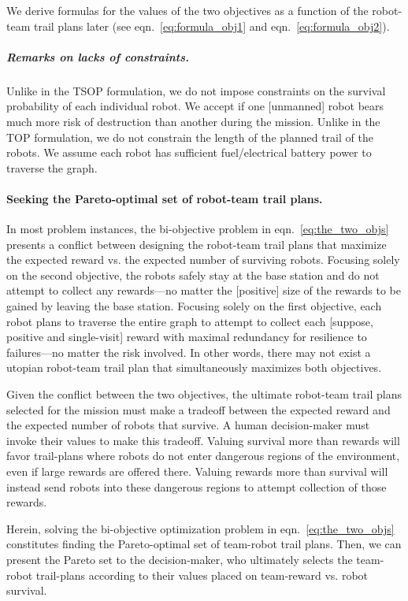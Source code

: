 \documentclass[11pt, oneside]{article}
\begin{document}
We derive formulas for the values of the two objectives as a function of the robot-team trail plans later (see eqn.~\ref{eq:formula_obj1} and eqn.~\ref{eq:formula_obj2}). 

\subparagraph{Remarks on lacks of constraints.} 
Unlike in the TSOP formulation, we do not impose constraints on the survival probability of each individual robot. We accept if one [unmanned] robot bears much more risk of destruction than another during the mission. 
Unlike in the TOP formulation, we do not constrain the length of the planned trail of the robots. We assume each robot has sufficient fuel/electrical battery power to traverse the graph.


\paragraph{Seeking the Pareto-optimal set of robot-team trail plans.} 
In most problem instances, the bi-objective problem in eqn.~\ref{eq:the_two_objs} presents a conflict between designing the robot-team trail plans that maximize the expected reward vs. the expected number of surviving robots. 
Focusing solely on the second objective, the robots safely stay at the base station and do not attempt to collect any rewards---no matter the [positive] size of the rewards to be gained by leaving the base station. 
Focusing solely on the first objective, each robot plans to traverse the entire graph to attempt to collect each [suppose, positive and single-visit] reward with maximal redundancy for resilience to failures---no matter the risk involved.
In other words, there may not exist a utopian robot-team trail plan that simultaneously maximizes both objectives. 

Given the conflict between the two objectives, the ultimate robot-team trail plans selected for the mission must make a tradeoff between the expected reward and the expected number of robots that survive. 
A human decision-maker must invoke their values to make this tradeoff.
Valuing survival more than rewards will favor trail-plans where robots do not enter dangerous regions of the environment, even if large rewards are offered there. Valuing rewards more than survival will instead send robots into these dangerous regions to attempt collection of those rewards. 

Herein, solving the bi-objective optimization problem in eqn.~\ref{eq:the_two_objs} constitutes finding the Pareto-optimal set of team-robot trail plans. Then, we can present the Pareto set to the decision-maker, who ultimately selects the team-robot trail-plans according to their values placed on team-reward vs. robot survival. 
\end{document}
